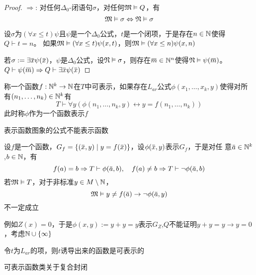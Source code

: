 \documentclass[11pt]{article}
\begin{document}
\begin{proof}
\(\Rightarrow\): 对任何\(\Delta_0\)-闭语句\(\sigma\)，对任何\(\mathfrak{M}\vDash Q\)，有
\begin{equation*}
\mathfrak{M}\vDash\sigma\Leftrightarrow\mathfrak{N}\vDash\sigma
\end{equation*}

设\(\sigma\)为\((\forall x\le t)\psi\)且\(\psi\)是一个\(\Delta_0\)公式，\(t\)是一个闭项，于是存在\(n\in\mathbb{N}\)使得\(Q\vdash t=n\)。
如果\(\mathfrak{M}\vDash(\forall x\le t)\psi(x,t)\)，则\(\mathfrak{M}\vDash(\forall x\le n)\psi(x,n)\)

若\(\sigma:=\exists\barx\psi(\barx)\)，\(\psi\)是\(\Delta_0\)公式，设\(\mathfrak{N}\vDash\sigma\)，则存在\(\barm\in\N^n\)使得\(\fN\vDash\psi(\barm)\)。
\(Q\vdash\psi(\barm)\Rightarrow Q\vdash\exists\barx\psi(\barx)\)
\end{proof}

\begin{definition}[]
称一个函数\(f:\mathbb{N}^k\to\mathbb{N}\)在\(T\)中可表示，如果存在\(L_{ar}\)公式\(\phi(x_1,\dots,x_k,y)\)使得对所
有\((n_1,\dots,n_k)\in\mathbb{N}^k\)有
\begin{equation*}
T\vdash\forall y\left( \phi(n_1,\dots,n_k,y)\leftrightarrow y=f(n_1,\dots,n_k) \right)
\end{equation*}
此时称\(\phi\)作为一个函数表示\(f\)
\end{definition}

表示函数图象的公式不能表示函数

设\(f\)是一个函数，\(G_f=\{(\barx,y)\mid y=f(\barx)\}\)，设\(\phi(\barx,y)\)表示\(G_f\)，于是对任
意\(\bara\in\N^k\),\(b\in\mathbb{N}\)，有
\begin{equation*}
f(a)=b\Rightarrow T\vdash\phi(\bara,b),\quad f(a)\neq b\Rightarrow T\vdash\neg\phi(\bara,b)
\end{equation*}
若\(\mathfrak{M}\vDash T\)，对于非标准\(y\in M\setminus\mathbb{N}\)，
\begin{equation*}
\fM\vDash y\neq f(\bara)\to\neg\phi(\bara,y)
\end{equation*}
不一定成立

例如\(Z(x)=0\)，于是\(\phi(x,y):=y+y=y\)表示\(G_Z\),\(Q\)不能证明\(y+y=y\to y=0\)，考虑\(\mathbb{N}\cup\{\infty\}\)

\begin{lemma}[]
令\(t\)为\(L_{ar}\)的项，则\(t\)诱导出来的函数是可表示的
\end{lemma}

\begin{theorem}[]
可表示函数类关于复合封闭
\end{theorem}
\end{document}
